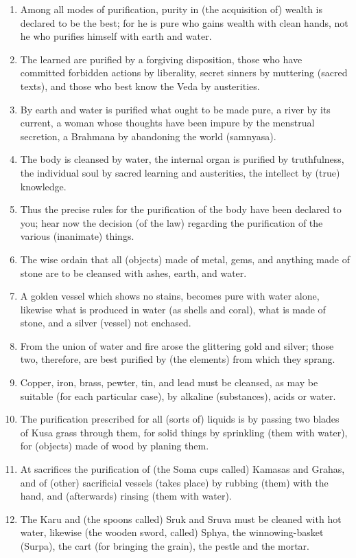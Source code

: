 \begin{enumerate}
\item Among all modes of purification, purity in (the acquisition of) wealth is declared to be the best; for he is pure who gains wealth with clean hands, not he who purifies himself with earth and water.
\item The learned are purified by a forgiving disposition, those who have committed forbidden actions by liberality, secret sinners by muttering (sacred texts), and those who best know the Veda by austerities.
\item By earth and water is purified what ought to be made pure, a river by its current, a woman whose thoughts have been impure by the menstrual secretion, a Brahmana by abandoning the world (samnyasa).
\item The body is cleansed by water, the internal organ is purified by truthfulness, the individual soul by sacred learning and austerities, the intellect by (true) knowledge.
\item Thus the precise rules for the purification of the body have been declared to you; hear now the decision (of the law) regarding the purification of the various (inanimate) things.
\item The wise ordain that all (objects) made of metal, gems, and anything made of stone are to be cleansed with ashes, earth, and water.
\item A golden vessel which shows no stains, becomes pure with water alone, likewise what is produced in water (as shells and coral), what is made of stone, and a silver (vessel) not enchased.
\item From the union of water and fire arose the glittering gold and silver; those two, therefore, are best purified by (the elements) from which they sprang.
\item Copper, iron, brass, pewter, tin, and lead must be cleansed, as may be suitable (for each particular case), by alkaline (substances), acids or water.
\item The purification prescribed for all (sorts of) liquids is by passing two blades of Kusa grass through them, for solid things by sprinkling (them with water), for (objects) made of wood by planing them.
\item At sacrifices the purification of (the Soma cups called) Kamasas and Grahas, and of (other) sacrificial vessels (takes place) by rubbing (them) with the hand, and (afterwards) rinsing (them with water).
\item The Karu and (the spoons called) Sruk and Sruva must be cleaned with hot water, likewise (the wooden sword, called) Sphya, the winnowing-basket (Surpa), the cart (for bringing the grain), the pestle and the mortar.

\end{enumerate}
